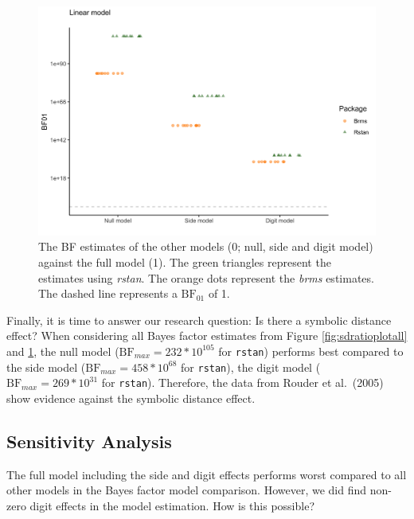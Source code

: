 \documentclass[
  english,
  doc,floatsintext]{apa6}
\begin{document}
\begin{figure}[H]

\includegraphics[width=0.7\linewidth]{I - Images/Fig17_normalbfplot01} \hfill{}

\caption{The BF estimates of the other models (0; null, side and digit model) against the full model (1). The green triangles represent the estimates using \textit{rstan}. The orange dots represent the \textit{brms} estimates. The dashed line represents a $\text{BF}_{01}$ of 1. }\label{fig:bsbfestimatesbrmsrstan}
\end{figure}

Finally, it is time to answer our research question: Is there a symbolic distance effect? When considering all Bayes factor estimates from Figure \ref{fig:sdratioplotall} and \ref{fig:bsbfestimatesbrmsrstan}, the null model (\(\text{BF}_{max} = 232 * 10^{105}\) for \texttt{rstan}) performs best compared to the side model (\(\text{BF}_{max} = 458 * 10^{68}\) for \texttt{rstan}), the digit model (\(\text{BF}_{max} = 269 * 10^{31}\) for \texttt{rstan}). Therefore, the data from Rouder et al.~(2005) show evidence against the symbolic distance effect.

\hypertarget{sensitivity-analysis}{%
\subsection{Sensitivity Analysis}\label{sensitivity-analysis}}

The full model including the side and digit effects performs worst compared to all other models in the Bayes factor model comparison. However, we did find non-zero digit effects in the model estimation. How is this possible?
\end{document}
